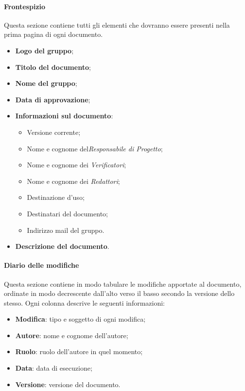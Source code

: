 \paragraph{Frontespizio} \Spazio
Questa sezione contiene tutti gli elementi che dovranno essere presenti nella prima pagina di ogni documento.
\begin{itemize}
	\item \textbf{Logo del gruppo};
	\item \textbf{Titolo del documento};
	\item \textbf{Nome del gruppo};
	\item \textbf{Data di approvazione};
	\item \textbf{Informazioni sul documento}:
	\begin{itemize}
		\item {Versione corrente};
		\item {Nome e cognome del\emph{Responsabile di Progetto}};
		\item {Nome e cognome dei \emph{Verificatori}};
		\item {Nome e cognome dei \emph{Redattori}};
		\item {Destinazione d'uso};
		\item {Destinatari del documento};
		\item {Indirizzo mail del gruppo}.
	\end{itemize}
	\item \textbf{Descrizione del documento}.
\end{itemize}



\paragraph{Diario delle modifiche} \Spazio
Questa sezione contiene in modo tabulare le modifiche apportate al documento, ordinate in modo decrescente dall'alto verso il basso secondo la versione dello stesso. Ogni colonna descrive le seguenti informazioni:
\begin{itemize}
	\item \textbf{Modifica}: tipo e soggetto di ogni modifica; 
	\item \textbf{Autore}: nome e cognome dell'autore;
	\item \textbf{Ruolo}: ruolo dell'autore in quel momento;
	\item \textbf{Data}: data di esecuzione;
	\item \textbf{Versione}: versione del documento.
\end{itemize}

